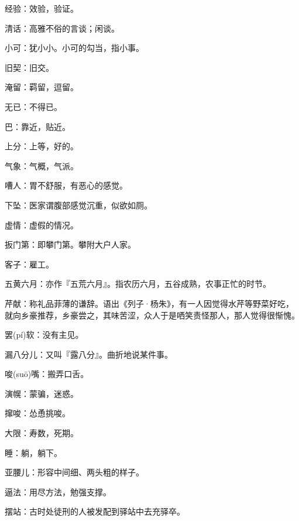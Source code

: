 \startbuffer[1005]
经验：效验，验证。
\stopbuffer


\startbuffer[1006]
清话：高雅不俗的言谈；闲谈。
\stopbuffer


\startbuffer[1007]
小可：犹小小。小可的勾当，指小事。
\stopbuffer


\startbuffer[1008]
旧契：旧交。
\stopbuffer


\startbuffer[1009]
淹留：羁留，逗留。
\stopbuffer


\startbuffer[1010]
无已：不得已。
\stopbuffer


\startbuffer[1011]
巴：靠近，贴近。
\stopbuffer


\startbuffer[1012]
上分：上等，好的。
\stopbuffer


\startbuffer[1013]
气象：气概，气派。
\stopbuffer


\startbuffer[1014]
嘈人：胃不舒服，有恶心的感觉。
\stopbuffer


\startbuffer[1015]
下坠：医家谓腹部感觉沉重，似欲如厕。
\stopbuffer


\startbuffer[1016]
虚情：虚假的情况。
\stopbuffer


\startbuffer[1017]
扳门第：即攀门第。攀附大户人家。
\stopbuffer


\startbuffer[1018]
客子：雇工。
\stopbuffer


\startbuffer[1019]
五黄六月：亦作『五荒六月』。指农历六月，五谷成熟，农事正忙的时节。
\stopbuffer


\startbuffer[1020]
芹献：称礼品菲薄的谦辞。语出《列子·杨朱》，有一人因觉得水芹等野菜好吃，就向乡豪推荐，乡豪尝之，其味苦涩，众人于是哂笑责怪那人，那人觉得很惭愧。
\stopbuffer


\startbuffer[1021]
罢(pí)软：没有主见。
\stopbuffer


\startbuffer[1022]
漏八分儿：又叫『露八分』。曲折地说某件事。
\stopbuffer


\startbuffer[1023]
唆(suō)嘴：搬弄口舌。
\stopbuffer


\startbuffer[1024]
演幌：蒙骗，迷惑。
\stopbuffer


\startbuffer[1025]
撺唆：怂恿挑唆。
\stopbuffer


\startbuffer[1026]
大限：寿数，死期。
\stopbuffer


\startbuffer[1027]
睡：躺，躺下。
\stopbuffer


\startbuffer[1028]
亚腰儿：形容中间细、两头粗的样子。
\stopbuffer


\startbuffer[1029]
逼法：用尽方法，勉强支撑。
\stopbuffer


\startbuffer[1030]
摆站：古时处徒刑的人被发配到驿站中去充驿卒。
\stopbuffer


